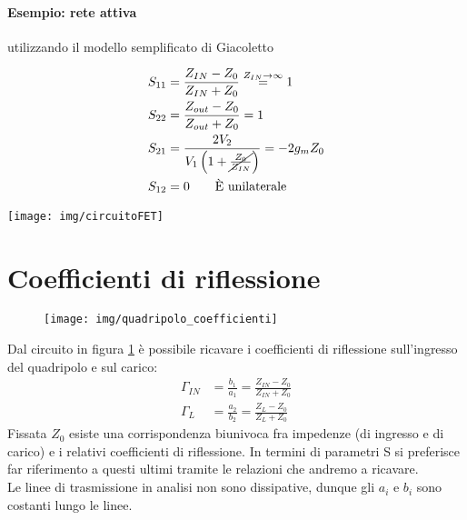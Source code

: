 \vspace{1em}
\begin{minipage}{.65\linewidth}
	\paragraph{Esempio: rete attiva} utilizzando il modello semplificato di Giacoletto
	
	\begin{align*}
	S_{11} &= \frac{Z_{IN} - Z_0}{Z_{IN} + Z_0}
	\overset{Z_{IN}\rightarrow\infty}{=} 1 \\
	S_{22} &= \frac{Z_{out} - Z_0}{Z_{out}+Z_0} = 1
	\\
	S_{21} &= \frac{2V_2}{V_1 \left(
		1+\cancel{\frac{Z_0}{Z_{IN}}}
		\right)}
	=
	-2 g_m Z_0
	\\
	S_{12} &= 0 \qquad \mbox{È unilaterale}
	\end{align*}
\end{minipage}
\begin{minipage}[t]{.35\linewidth}
	\centering
	\texttt{[image: img/circuitoFET]}
\end{minipage}


\section{Coefficienti di riflessione}
\begin{figure}[bht]
	\centering
	\texttt{[image: img/quadripolo\_coefficienti]}
	\caption{}
	\label{fig:coefficienti}
\end{figure}
Dal circuito in figura \ref{fig:coefficienti} è possibile ricavare i coefficienti di riflessione sull'ingresso del quadripolo e sul carico:
\begin{align}
\Gamma_{IN} &= \frac{b_1}{a_1} = \frac{Z_{IN} - Z_0}{Z_{IN} + Z_0}\\
\Gamma_L &=  \frac{a_2}{b_2} = \frac{Z_{L} - Z_0}{Z_{L} + Z_0}
\end{align}
Fissata $Z_0$ esiste una corrispondenza biunivoca fra impedenze (di ingresso e di carico) e i relativi coefficienti di riflessione. In termini di parametri S si preferisce far riferimento a questi ultimi tramite le relazioni che andremo a ricavare.
\\
Le linee di trasmissione in analisi non sono dissipative, dunque gli $a_i$ e $b_i$ sono costanti lungo le linee.


